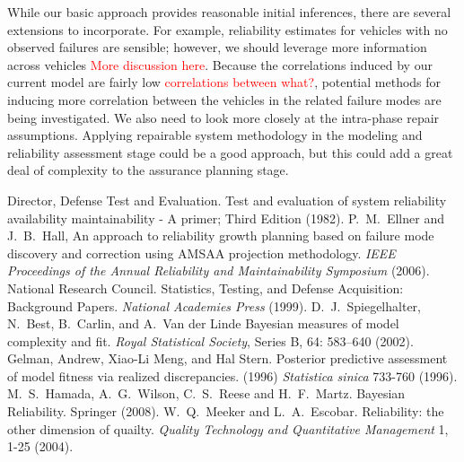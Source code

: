 \documentclass[12pt]{article}
\begin{document}
While our basic approach provides reasonable initial inferences, there are
several extensions to incorporate. For example, reliability estimates for
vehicles with no observed failures are sensible; however, we should leverage
more information across vehicles \textcolor{red}{More discussion here}. Because the correlations induced by our
current model are fairly low \textcolor{red}{correlations between what?}, potential methods for inducing more correlation
between the vehicles in the related failure modes are being investigated. We
also need to look more closely at the intra-phase repair assumptions.  Applying
repairable system methodology in the modeling and reliability assessment stage
could be a good approach, but this could  add a great deal of complexity to the
assurance planning stage.


\begin{thebibliography}{99}
 Director, Defense Test and Evaluation. Test and evaluation of system reliability availability maintainability - A primer; Third Edition (1982).
 P.\ M.\ Ellner and J.\ B.\ Hall, An approach to reliability
growth planning based on failure mode discovery and correction using AMSAA
projection methodology. \textit{IEEE Proceedings of the Annual Reliability and
Maintainability Symposium} (2006).
 National Research Council. Statistics, Testing, and Defense
Acquisition: Background Papers. \textit{National Academies Press} (1999).
 D.\ J.\ Spiegelhalter, N.\ Best, B.\ Carlin, and A.\ Van der
Linde Bayesian measures of model complexity and fit. \textit{Royal Statistical
Society}, Series B, 64: 583–640 (2002).
 Gelman, Andrew, Xiao-Li Meng, and Hal Stern. Posterior
predictive assessment of model fitness via realized discrepancies. (1996)
\textit{Statistica sinica} 733-760 (1996).
 M.\ S.\ Hamada, A.\ G.\ Wilson, C.\ S.\ Reese and H.\ F.\ Martz.
Bayesian Reliability. Springer (2008).
 W.\ Q.\ Meeker and L.\ A.\ Escobar. Reliability: the other
dimension of quailty. \textit{Quality Technology and Quantitative Management} 1,
1-25 (2004).
\end{thebibliography}
\end{document}
